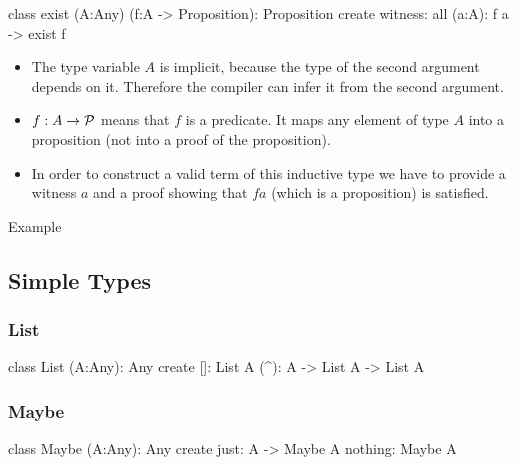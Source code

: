 \begin{alba}
  class
     exist (A:Any) (f:A -> Proposition): Proposition
  create
     witness: all (a:A): f a -> exist f
\end{alba}

\begin{itemize}
\item The type variable $A$ is implicit, because the type of the second
  argument depends on it. Therefore the compiler can infer it from the second
  argument.

\item $f:A\to {\cal{P}}$ means that $f$ is a predicate. It maps any element of
  type $A$ into a proposition (not into a proof of the proposition).

\item In order to construct a valid term of this inductive type we have to
  provide a witness $a$ and a proof showing that $f a$ (which is a
  proposition) is satisfied.
\end{itemize}

Example






\subsection{Simple Types}
\label{sec:simple-types}



\subsubsection{List}

\begin{alba}
  class
    List (A:Any): Any
  create
    []: List A
    (^): A -> List A -> List A
\end{alba}
\vskip 2mm




\subsubsection{Maybe}

\begin{alba}
  class
    Maybe (A:Any): Any
  create
    just:    A -> Maybe A
    nothing: Maybe A
\end{alba}
\vskip 2mm


